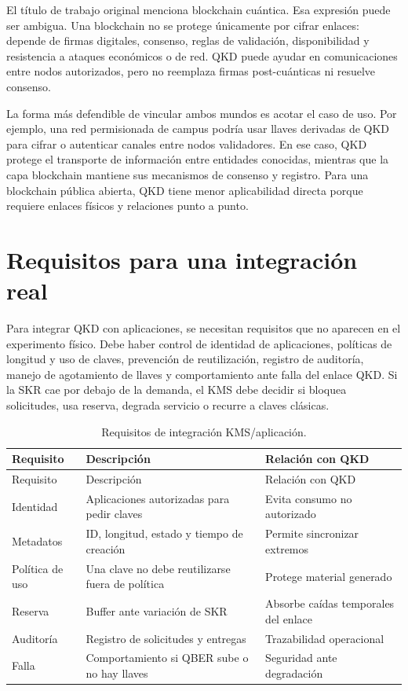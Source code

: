 El título de trabajo original menciona blockchain cuántica. Esa expresión puede ser ambigua. Una blockchain no se protege únicamente por cifrar enlaces: depende de firmas digitales, consenso, reglas de validación, disponibilidad y resistencia a ataques económicos o de red. QKD puede ayudar en comunicaciones entre nodos autorizados, pero no reemplaza firmas post-cuánticas ni resuelve consenso.

La forma más defendible de vincular ambos mundos es acotar el caso de uso. Por ejemplo, una red permisionada de campus podría usar llaves derivadas de QKD para cifrar o autenticar canales entre nodos validadores. En ese caso, QKD protege el transporte de información entre entidades conocidas, mientras que la capa blockchain mantiene sus mecanismos de consenso y registro. Para una blockchain pública abierta, QKD tiene menor aplicabilidad directa porque requiere enlaces físicos y relaciones punto a punto.

\section{Requisitos para una integración real}

Para integrar QKD con aplicaciones, se necesitan requisitos que no aparecen en el experimento físico. Debe haber control de identidad de aplicaciones, políticas de longitud y uso de claves, prevención de reutilización, registro de auditoría, manejo de agotamiento de llaves y comportamiento ante falla del enlace QKD. Si la SKR cae por debajo de la demanda, el KMS debe decidir si bloquea solicitudes, usa reserva, degrada servicio o recurre a claves clásicas.

\begin{longtable}{p{}p{}p{}}
  \caption{Requisitos de integración KMS/aplicación.}
  \label{tab:requisitos_kms}\\
  \toprule
  Requisito & Descripción & Relación con QKD \\
  \midrule
  \endfirsthead
  \toprule
  Requisito & Descripción & Relación con QKD \\
  \midrule
  \endhead
  Identidad & Aplicaciones autorizadas para pedir claves & Evita consumo no autorizado \\
  Metadatos & ID, longitud, estado y tiempo de creación & Permite sincronizar extremos \\
  Política de uso & Una clave no debe reutilizarse fuera de política & Protege material generado \\
  Reserva & Buffer ante variación de SKR & Absorbe caídas temporales del enlace \\
  Auditoría & Registro de solicitudes y entregas & Trazabilidad operacional \\
  Falla & Comportamiento si QBER sube o no hay llaves & Seguridad ante degradación \\
  \bottomrule
\end{longtable}

